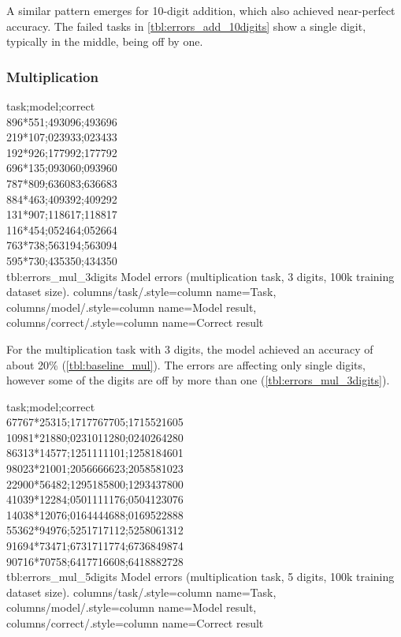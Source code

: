 A similar pattern emerges for 10-digit addition, which also achieved near-perfect accuracy. The failed tasks in \cref{tbl:errors_add_10digits} show a single digit, typically in the middle, being off by one. 

\subsubsection{Multiplication}

{
    task;model;correct\\
    896*551;493096;493696\\
    219*107;023933;023433\\
    192*926;177992;177792\\
    696*135;093060;093960\\
    787*809;636083;636683\\
    884*463;409392;409292\\
    131*907;118617;118817\\
    116*454;052464;052664\\
    763*738;563194;563094\\
    595*730;435350;434350\\
}
{tbl:errors_mul_3digits}
{
    Model errors (multiplication task, 3 digits, 100k training dataset size).
}
{
    columns/task/.style={column name={Task}},
    columns/model/.style={column name={Model result}},
    columns/correct/.style={column name={Correct result}}
}

For the multiplication task with 3 digits, the model achieved an accuracy of about 20\% (\cref{tbl:baseline_mul}). The errors are affecting only single digits, however some of the digits are off by more than one (\cref{tbl:errors_mul_3digits}).

{
    task;model;correct\\
    67767*25315;1717767705;1715521605\\
    10981*21880;0231011280;0240264280\\
    86313*14577;1251111101;1258184601\\
    98023*21001;2056666623;2058581023\\
    22900*56482;1295185800;1293437800\\
    41039*12284;0501111176;0504123076\\
    14038*12076;0164444688;0169522888\\
    55362*94976;5251717112;5258061312\\
    91694*73471;6731711774;6736849874\\
    90716*70758;6417716608;6418882728\\
}
{tbl:errors_mul_5digits}
{
    Model errors (multiplication task, 5 digits, 100k training dataset size).
}
{
    columns/task/.style={column name={Task}},
    columns/model/.style={column name={Model result}},
    columns/correct/.style={column name={Correct result}}
}

